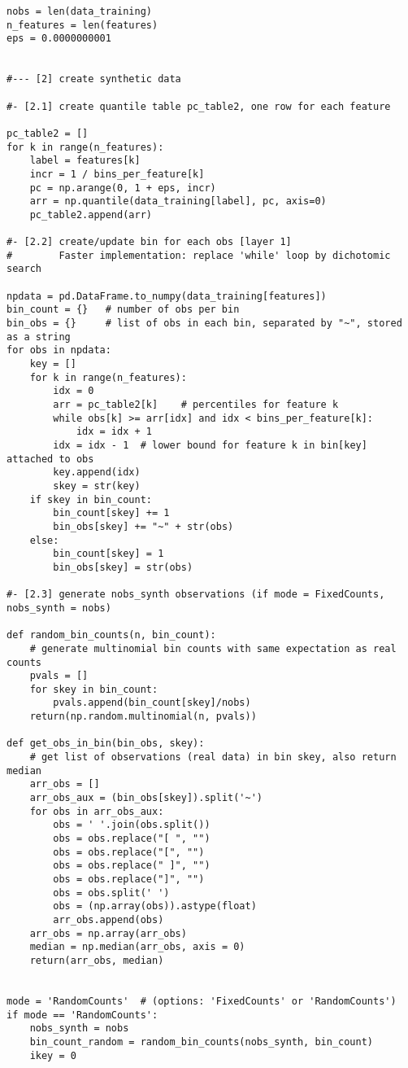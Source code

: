 \documentclass[oneside,10pt]{book}
\begin{document}
\begin{lstlisting}
nobs = len(data_training)
n_features = len(features)
eps = 0.0000000001 


#--- [2] create synthetic data  

#- [2.1] create quantile table pc_table2, one row for each feature

pc_table2 = []
for k in range(n_features):
    label = features[k]
    incr = 1 / bins_per_feature[k]   
    pc = np.arange(0, 1 + eps, incr)
    arr = np.quantile(data_training[label], pc, axis=0)
    pc_table2.append(arr)

#- [2.2] create/update bin for each obs [layer 1]
#        Faster implementation: replace 'while' loop by dichotomic search

npdata = pd.DataFrame.to_numpy(data_training[features])
bin_count = {}   # number of obs per bin
bin_obs = {}     # list of obs in each bin, separated by "~", stored as a string
for obs in npdata:
    key = [] 
    for k in range(n_features):
        idx = 0
        arr = pc_table2[k]    # percentiles for feature k
        while obs[k] >= arr[idx] and idx < bins_per_feature[k]: 
            idx = idx + 1
        idx = idx - 1  # lower bound for feature k in bin[key] attached to obs
        key.append(idx)
        skey = str(key)
    if skey in bin_count:
        bin_count[skey] += 1
        bin_obs[skey] += "~" + str(obs)
    else:
        bin_count[skey] = 1
        bin_obs[skey] = str(obs)

#- [2.3] generate nobs_synth observations (if mode = FixedCounts, nobs_synth = nobs)

def random_bin_counts(n, bin_count):
    # generate multinomial bin counts with same expectation as real counts
    pvals = []
    for skey in bin_count:
        pvals.append(bin_count[skey]/nobs)
    return(np.random.multinomial(n, pvals))

def get_obs_in_bin(bin_obs, skey): 
    # get list of observations (real data) in bin skey, also return median
    arr_obs = []
    arr_obs_aux = (bin_obs[skey]).split('~')
    for obs in arr_obs_aux:
        obs = ' '.join(obs.split())
        obs = obs.replace("[ ", "")
        obs = obs.replace("[", "")
        obs = obs.replace(" ]", "")
        obs = obs.replace("]", "")
        obs = obs.split(' ')
        obs = (np.array(obs)).astype(float)
        arr_obs.append(obs)
    arr_obs = np.array(arr_obs)
    median = np.median(arr_obs, axis = 0)
    return(arr_obs, median) 

    
mode = 'RandomCounts'  # (options: 'FixedCounts' or 'RandomCounts')
if mode == 'RandomCounts':
    nobs_synth = nobs 
    bin_count_random = random_bin_counts(nobs_synth, bin_count)
    ikey = 0


\end{lstlisting}
\end{document}
